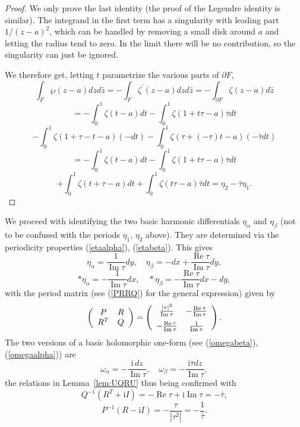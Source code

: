 \documentclass[reqno,12pt]{article}
\theoremstyle{plain}
\theoremstyle{definition}
\numberwithin{equation}{section}
\numberwithin{figure}{section}
\DeclareMathOperator{\re}{Re}
\DeclareMathOperator{\im}{Im}
\def\I{\mathrm{i}}
\begin{document}
\begin{proof}
We only prove the last identity (the proof of the Legendre identity is similar). 
The integrand in the first term has a singularity with leading part $1/(z-a)^2$, 
which can be handled by removing a small disk
around $a$ and letting the radius tend to zero. In the limit there will be no contribution,
so the singularity can just be ignored.

We therefore get, letting $t$ parametrize the various parts of $\partial F$,
$$
\int_F\wp({z-a})dzd\bar{z}=-\int_F \zeta^\prime(z-a) dzd\bar{z}=-\int_{\partial F} \zeta(z-a)d\bar{z} 
$$
$$
=-\int_0^1\zeta(t-a)dt-\int_0^1 \zeta(1+t\tau-a)\bar{\tau}dt
$$
$$
-\int_0^1\zeta(1+\tau-t-a)(-dt)-\int_0^1\zeta(\tau+(-\tau) t-a)(-\bar{\tau}dt)
$$
$$
=-\int_0^1\zeta(t-a)dt-\int_0^1 \zeta(1+t\tau-a)\bar{\tau}dt
$$
$$
+\int_0^1\zeta(t+\tau-a)dt+\int_0^1\zeta(t\tau -a)\bar{\tau}dt
=\eta_2-\bar{\tau}\eta_1.
$$
\end{proof}

We proceed with identifying the two basic harmonic differentials $\eta_\alpha$ and $\eta_\beta$
(not to be confused with the periods $\eta_1$, $\eta_2$ above).
They  are determined via the periodicity properties (\ref{etaalpha}), (\ref{etabeta}). This gives
$$
\eta_\alpha=\frac{1}{\im \tau}dy, \quad \eta_\beta=-dx+\frac{\re \tau}{\im \tau}dy,
$$
$$
*\eta_\alpha=-\frac{1}{\im \tau}dx, \quad *\eta_\beta=-\frac{\re \tau}{\im \tau}dx-dy,
$$
with the period matrix (see (\ref{PRRQ}) for the general expression) given by
\begin{equation*}
\left( \begin{array}{cc}
                                            P & R  \\
                                              R^T & Q  \\
\end{array} \right)=
\left( \begin{array}{cc} 
\frac{|\tau|^2}{\im\tau} & -\frac{\re \tau}{\im\tau}  
\vspace{2mm}\\
                                             -\frac{\re \tau}{\im\tau}   & \frac{1}{\im\tau} \\
\end{array} \right).
\end{equation*}
The two versions of a basic holomorphic one-form (see (\ref{omegabeta}), (\ref{omegaalpha})) are
$$
\omega_\alpha=-\frac{\I \,dz}{\im \tau},\quad 
\omega_\beta=-\frac{\I\bar{\tau}dz}{\im\tau},
$$
the relations in Lemma~\ref{lem:UQRU} thus being confirmed with
$$
Q^{-1}(R^T+\I I)= -\re\tau+\I\im\tau=-\bar{\tau},
$$
$$
P^{-1}(R-\I I)=-\frac{{\tau}}{|\tau^2|}=-\frac{1}{\bar{\tau}}.
$$
\end{document}
